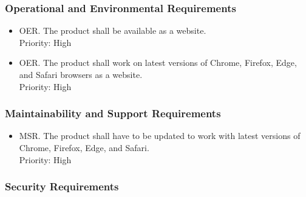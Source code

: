 \documentclass[12pt]{article}
\newcounter{oernum} %
\newcounter{msrnum} %
\newcounter{srnum} %
\begin{document}
\subsubsection{Operational and Environmental Requirements}

\begin {itemize}
    \item[OER\refstepcounter{oernum}\theoernum \label{R_Output}.] The product shall be available as a website.\\
    Priority: High
    
    \item[OER\refstepcounter{oernum}\theoernum \label{R_Output}.] The product shall work on latest versions of Chrome, Firefox, Edge, and Safari browsers as a website.\\
    Priority: High
    
\end {itemize}

\subsubsection{Maintainability and Support Requirements}

\begin {itemize}
    \item[MSR\refstepcounter{msrnum}\themsrnum \label{R_Output}.] The product shall have to be updated to work with latest versions of Chrome, Firefox, Edge, and Safari.\\
    Priority: High
    
\end {itemize}

\subsubsection{Security Requirements}
\end{document}
